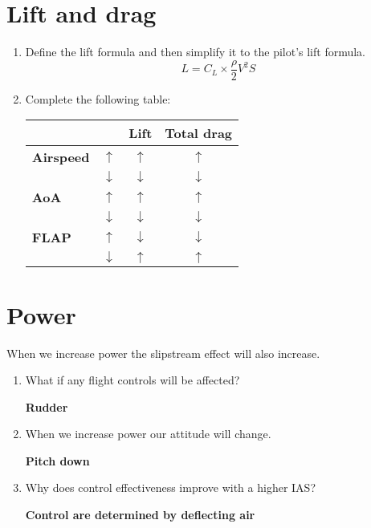\documentclass[11pt]{article}
\begin{document}
\section{Lift and drag}
\begin{enumerate}
	\item Define the lift formula and then simplify it to the pilot's lift formula.
	\[L = C_L\times\frac{\rho}{2}V^2S \]
	\item Complete the following table:

	\begin{tabular}{lccc}
	\toprule
	& & \textbf{Lift} & \textbf{Total drag} \\
	\midrule
	\textbf{Airspeed} & \(\uparrow\)   & \(\uparrow\)   & \(\uparrow\) \\
	                  & \(\downarrow\) & \(\downarrow\) & \(\downarrow\) \\
	\textbf{AoA}      & \(\uparrow\)   & \(\uparrow\)   & \(\uparrow\)\\
	                  & \(\downarrow\) & \(\downarrow\) & \(\downarrow\) \\
  \textbf{FLAP}     & \(\uparrow\)   & \(\downarrow\) & \(\downarrow\) \\
                    & \(\downarrow\) & \(\uparrow\)   & \(\uparrow\) \\
  \bottomrule
	\end{tabular}
	\end{enumerate}
\section{Power}
When we increase power the slipstream effect will also increase.
\begin{enumerate}
	\item What if any flight controls will be affected?

	\textbf{Rudder}
	\item When we increase power our attitude will change. 

	\textbf{Pitch down}
	\item Why does control effectiveness improve with a higher IAS?

	\textbf{Control are determined by deflecting air}
\end{enumerate}
\end{document}
